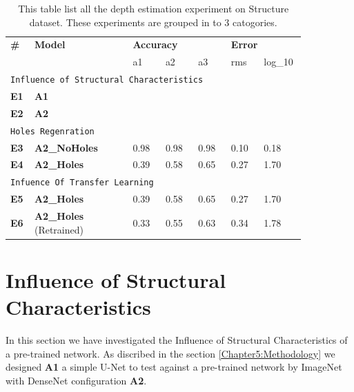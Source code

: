 \begin{table}[h]
\begin{tabular}{p{0.05\linewidth}p{0.3\linewidth}p{0.1\linewidth}p{0.1\linewidth}p{0.1\linewidth}p{0.1\linewidth}p{0.1\linewidth}}
\hline
\textbf{\#} & \textbf{Model} & \multicolumn{3}{l}{\textbf{Accuracy}} & \multicolumn{2}{l}{\textbf{Error}} \\ \cline{3-7} 
                    &                        & a1       & a2       & a3      & rms         & log\_10      \\ \hline
\multicolumn{7}{l}{\texttt{Influence of Structural Characteristics}}                                            \\ \hline
\textbf{E1}                  &  \textbf{A1}               &          &          &         &             &              \\ \hline
\textbf{E2}                  & \textbf{A2}                  &          &          &         &             &              \\ \hline
\multicolumn{7}{l}{\texttt{Holes Regenration}}                                                                   \\ \hline
\textbf{E3}                  & \textbf{A2\_NoHoles}            & 0.98   & 0.98   & 0.98  & 0.10       & 0.18        \\ \hline
\textbf{E4}                  & \textbf{A2\_Holes}              & 0.39   & 0.58   & 0.65  & 0.27      & 1.70       \\ \hline
\multicolumn{7}{l}{\texttt{Infuence Of Transfer Learning}}                                                       \\ \hline
\textbf{E5}                  & \textbf{A2\_Holes}              & 0.39   & 0.58   & 0.65  & 0.27      & 1.70       \\ \hline
\textbf{E6}                  & \textbf{A2\_Holes} (Retrained) & 0.33   & 0.55   & 0.63  & 0.34      & 1.78       \\ \hline
\end{tabular}

\caption{This table list all the depth estimation experiment on Structure dataset. These experiments are grouped in to 3 catogories.}
\end{table}

\section{Influence of Structural Characteristics}
\label{Chapter6:Influence_Structural_Char}
In this section we have investigated the Influence of Structural Characteristics of a pre-trained network.  As discribed in the section \ref{Chapter5:Methodology} we designed \textbf{A1} a simple U-Net to test against a pre-trained network by ImageNet with DenseNet configuration \textbf{A2}. 
 
